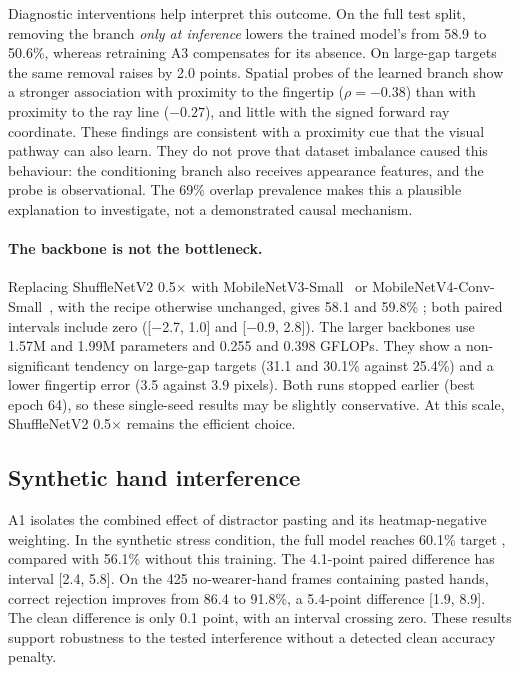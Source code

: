 Diagnostic interventions help interpret this outcome. On the full test split, removing the branch \emph{only at inference} lowers the trained model's  from 58.9 to 50.6\%, whereas retraining A3 compensates for its absence. On large-gap targets the same removal raises  by 2.0 points. Spatial probes of the learned branch show a stronger association with proximity to the fingertip ($\rho=-0.38$) than with proximity to the ray line ($-0.27$), and little with the signed forward ray coordinate. These findings are consistent with a proximity cue that the visual pathway can also learn. They do not prove that dataset imbalance caused this behaviour: the conditioning branch also receives appearance features, and the probe is observational. The 69\% overlap prevalence makes this a plausible explanation to investigate, not a demonstrated causal mechanism.

\paragraph{The backbone is not the bottleneck.}
Replacing ShuffleNetV2 0.5$\times$ with MobileNetV3-Small~\cite{howard2019mobilenetv3} or MobileNetV4-Conv-Small~\cite{qin2024mobilenetv4}, with the recipe otherwise unchanged, gives 58.1 and 59.8\% ; both paired intervals include zero ([$-$2.7, 1.0] and [$-$0.9, 2.8]). The larger backbones use 1.57M and 1.99M parameters and 0.255 and 0.398 GFLOPs. They show a non-significant tendency on large-gap targets (31.1 and 30.1\% against 25.4\%) and a lower fingertip error (3.5 against 3.9 pixels). Both runs stopped earlier (best epoch 64), so these single-seed results may be slightly conservative. At this scale, ShuffleNetV2 0.5$\times$ remains the efficient choice.



\subsection{Synthetic hand interference}
A1 isolates the combined effect of distractor pasting and its heatmap-negative weighting. In the synthetic stress condition, the full model reaches 60.1\% target , compared with 56.1\% without this training. The 4.1-point paired difference has interval [2.4, 5.8]. On the 425 no-wearer-hand frames containing pasted hands, correct rejection improves from 86.4 to 91.8\%, a 5.4-point difference [1.9, 8.9]. The clean  difference is only 0.1 point, with an interval crossing zero. These results support robustness to the tested interference without a detected clean accuracy penalty.

